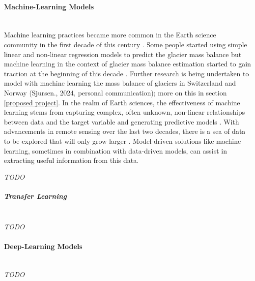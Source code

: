 \paragraph{Machine-Learning Models}\label{machine learning}\mbox{} \\
Machine learning practices became more common in the Earth science community in the first decade of this century \cite{dramsch-2020}. Some people started using simple linear and non-linear regression models to predict the glacier mass balance \cite{fountain-1999, aalgeirsdottir-2003} but machine learning in the context of glacier mass balance estimation started to gain traction at the beginning of this decade \cite{mutz-2022, guidicelli-2023, anilkumar-2023, diaconu-2024, ren-2024}. Further research is being undertaken to model with machine learning the mass balance of glaciers in Switzerland and Norway \cite{van-der-meer-2024} (Sjursen., 2024, personal communication); more on this in section \ref{proposed project}. In the realm of Earth sciences, the effectiveness of machine learning stems from capturing complex, often unknown, non-linear relationships between data and the target variable and generating predictive models \cite{bergen-2019}. With advancements in remote sensing over the last two decades, there is a sea of data to be explored that will only grow larger \cite{chi-2016}. Model-driven solutions like machine learning, sometimes in combination with data-driven models, can assist in extracting useful information from this data.  

\textit{TODO}

\subparagraph{Transfer Learning}\mbox{} \\

\textit{TODO}


\paragraph{Deep-Learning Models}\mbox{} \\

\textit{TODO}
\clearpage

